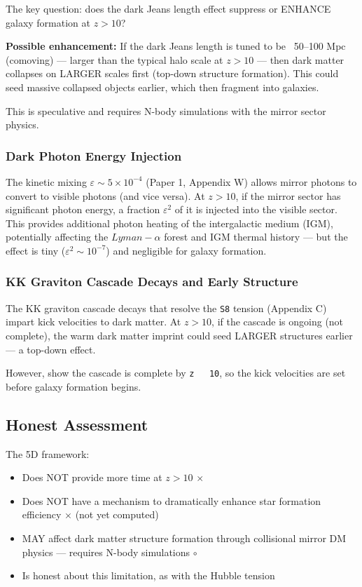 \documentclass[aps,prd,preprint,superscriptaddress,longbibliography]{revtex4-2}
\begin{document}
The key question: does the dark Jeans length effect suppress or ENHANCE galaxy formation at $z > 10$?

\textbf{Possible enhancement:} If the dark Jeans length is tuned to be ~50--100 Mpc (comoving) --- larger than the typical halo scale at $z > 10$ --- then dark matter collapses on LARGER scales first (top-down structure formation). This could seed massive collapsed objects earlier, which then fragment into galaxies.

This is speculative and requires N-body simulations with the mirror sector physics.


\subsubsection{Dark Photon Energy Injection}

The kinetic mixing $\varepsilon \sim  5 \times 10^{-4}$ (Paper 1, Appendix W) allows mirror photons to convert to visible photons (and vice versa). At $z > 10$, if the mirror sector has significant photon energy, a fraction $\varepsilon^{2}$ of it is injected into the visible sector. This provides additional photon heating of the intergalactic medium (IGM), potentially affecting the $Lyman-\alpha$ forest and IGM thermal history --- but the effect is tiny ($\varepsilon^{2} \sim  10^{-7}$) and negligible for galaxy formation.


\subsubsection{KK Graviton Cascade Decays and Early Structure}

The KK graviton cascade decays that resolve the \texttt{S8} tension (Appendix C) impart kick velocities to dark matter. At $z > 10$, if the cascade is ongoing (not complete), the warm dark matter imprint could seed LARGER structures earlier --- a top-down effect.

However, \cite{ObiedDarkDimensionS82023} show the cascade is complete by \texttt{z ~ 10}, so the kick velocities are set before galaxy formation begins.



\subsection{Honest Assessment}

The 5D framework:

\begin{itemize}
  \item Does NOT provide more time at $z > 10$ $\times$
  \item Does NOT have a mechanism to dramatically enhance star formation efficiency $\times$ (not yet computed)
  \item MAY affect dark matter structure formation through collisional mirror DM physics --- requires N-body simulations $\circ$
  \item Is honest about this limitation, as with the Hubble tension
\end{itemize}
\end{document}

